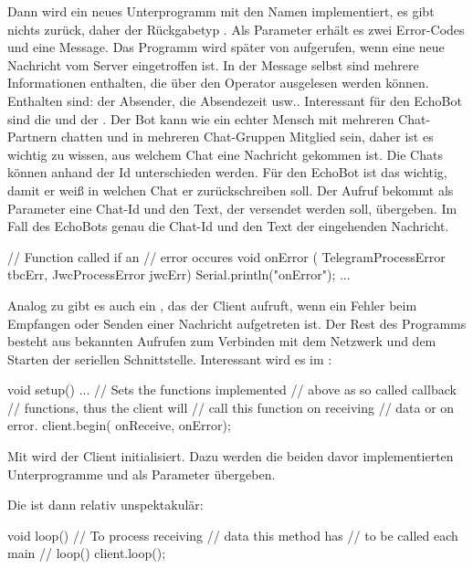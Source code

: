 \begin{multicols}{2}

Dann wird ein neues Unterprogramm mit den Namen  implementiert, es gibt nichts zurück, daher der
Rückgabetyp . Als Parameter erhält es zwei Error-Codes und eine Message. Das Programm
wird später von  aufgerufen, wenn eine neue Nachricht vom Server eingetroffen ist.
In der Message selbst sind mehrere Informationen enthalten, die über den Operator \code{->} ausgelesen werden können.
Enthalten sind: der Absender, die Absendezeit usw.. Interessant für den EchoBot sind die 
und der . Der Bot kann wie ein echter Mensch mit mehreren Chat-Partnern chatten und in mehreren
Chat-Gruppen Mitglied sein, daher ist es wichtig zu wissen, aus welchem Chat eine Nachricht gekommen ist.
Die Chats können anhand der Id unterschieden werden. Für den EchoBot ist das wichtig, damit er weiß in welchen
Chat er zurückschreiben soll. Der Aufruf  bekommt als Parameter eine Chat-Id und den Text, 
der versendet werden soll, übergeben. Im Fall des EchoBots genau die Chat-Id und den Text der eingehenden Nachricht.

\begin{src}
// Function called if an 
// error occures
void onError (
  TelegramProcessError tbcErr, 
  JwcProcessError jwcErr)
{
  Serial.println("onError");
  ...
}
\end{src}

Analog zu  gibt es auch ein , das der Client aufruft, wenn ein Fehler beim Empfangen oder
Senden einer Nachricht aufgetreten ist. Der Rest des Programms besteht aus bekannten Aufrufen zum Verbinden mit dem Netzwerk
und dem Starten der seriellen Schnittstelle. Interessant wird es im :
\begin{src}
void setup() {
  ...
  // Sets the functions implemented 
  // above as so called callback 
  // functions, thus the client will 
  // call this function on receiving 
  // data or on error.
  client.begin(      
      onReceive,
      onError);    
}
\end{src}
Mit  wird der Client initialisiert. Dazu werden die beiden davor implementierten Unterprogramme 
 und  als Parameter übergeben.

Die  ist dann relativ unspektakulär:

\begin{src}
void loop() {
  // To process receiving 
  // data this method has 
  // to be called each main 
  // loop()
  client.loop();
}
\end{src}


\end{multicols}

